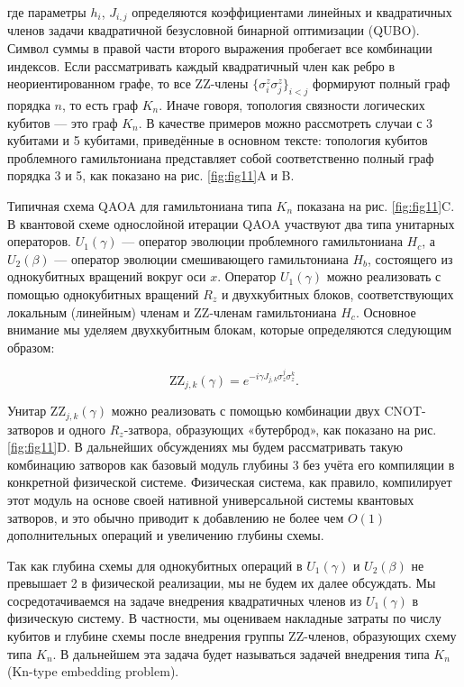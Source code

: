 где параметры $h_i$, $J_{i,j}$ определяются коэффициентами линейных и
квадратичных членов задачи квадратичной безусловной бинарной оптимизации
(QUBO). Символ суммы в правой части второго выражения пробегает все комбинации
индексов. Если рассматривать каждый квадратичный член как ребро в
неориентированном графе, то все ZZ-члены $\{\sigma_i^z \sigma_j^z\}_{i<j}$
формируют полный граф порядка $n$, то есть граф $K_n$. Иначе говоря, топология
связности логических кубитов — это граф $K_n$. В качестве примеров можно
рассмотреть случаи с 3 кубитами и 5 кубитами, приведённые в основном тексте:
топология кубитов проблемного гамильтониана представляет собой соответственно
полный граф порядка 3 и 5, как показано на рис. \ref{fig:fig11}A и B.

Типичная схема QAOA для гамильтониана типа $K_n$ показана на рис.
\ref{fig:fig11}C. В квантовой схеме однослойной итерации QAOA участвуют два
типа унитарных операторов. $U_1(\gamma)$ — оператор эволюции проблемного
гамильтониана $H_c$, а $U_2(\beta)$ — оператор эволюции смешивающего
гамильтониана $H_b$, состоящего из однокубитных вращений вокруг оси $x$.
Оператор $U_1(\gamma)$ можно реализовать с помощью однокубитных вращений $R_z$
и двухкубитных блоков, соответствующих локальным (линейным) членам и ZZ-членам
гамильтониана $H_c$. Основное внимание мы уделяем двухкубитным блокам, которые
определяются следующим образом:

\begin{equation}
\mathrm{ZZ}_{j,k}(\gamma) = e^{-i \gamma J_{j,k} \sigma_z^j \sigma_z^k}.
\end{equation}

Унитар $\text{ZZ}_{j,k}(\gamma)$ можно реализовать с помощью комбинации двух
CNOT-затворов и одного $R_z$-затвора, образующих «бутерброд», как показано на
рис. \ref{fig:fig11}D. В дальнейших обсуждениях мы будем рассматривать такую
комбинацию затворов как базовый модуль глубины 3 без учёта его компиляции в
конкретной физической системе. Физическая система, как правило, компилирует
этот модуль на основе своей нативной универсальной системы квантовых затворов,
и это обычно приводит к добавлению не более чем $O(1)$ дополнительных операций
и увеличению глубины схемы.

Так как глубина схемы для однокубитных операций в $U_1(\gamma)$ и $U_2(\beta)$
не превышает 2 в физической реализации, мы не будем их далее обсуждать. Мы
сосредотачиваемся на задаче внедрения квадратичных членов из $U_1(\gamma)$ в
физическую систему. В частности, мы оцениваем накладные затраты по числу
кубитов и глубине схемы после внедрения группы ZZ-членов, образующих схему типа
$K_n$. В дальнейшем эта задача будет называться задачей внедрения типа $K_n$
(Kn-type embedding problem).


